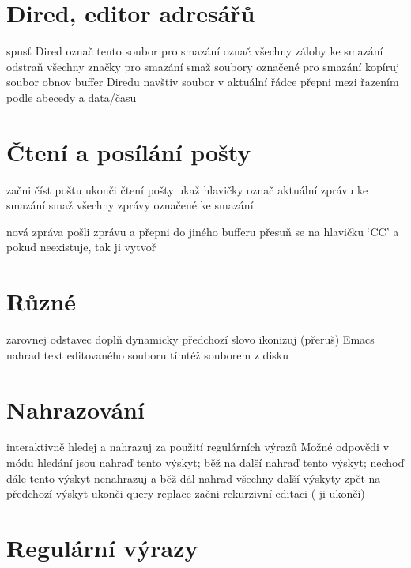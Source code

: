 \section{Dired, editor adresářů}

 spusť Dired
 označ tento soubor pro smazání
\key{\~{}} označ všechny zálohy ke smazání
 odstraň všechny značky pro smazání
 smaž soubory označené pro smazání
 kopíruj soubor
 obnov buffer Diredu
 navštiv soubor v aktuální řádce
 přepni mezi řazením podle abecedy a data/času

\section{Čtení a posílání pošty}

 začni číst poštu
 ukonči čtení pošty
 ukaž hlavičky
 označ aktuální zprávu ke smazání
 smaž všechny zprávy označené ke smazání

 nová zpráva
 pošli zprávu a přepni do jiného bufferu
 přesuň se na hlavičku `CC' a pokud neexistuje, tak ji
vytvoř

\section{Různé}

 zarovnej odstavec
 doplň dynamicky předchozí slovo
 ikonizuj (přeruš) Emacs
 nahraď text editovaného souboru tímtéž souborem z disku

\section{Nahrazování}

 interaktivně hledej a nahrazuj
 za použití regulárních výrazů
\askip
Možné odpovědi v módu hledání jsou
\askip
{} nahraď tento výskyt; běž na další
\key{,} nahraď tento výskyt; nechoď dále
 tento výskyt nenahrazuj a běž dál
\key{!} nahraď všechny další výskyty
\key{\^{}} zpět na předchozí výskyt
 ukonči query-replace
 začni rekurzivní editaci ( ji ukončí)

\section{Regulární výrazy}

